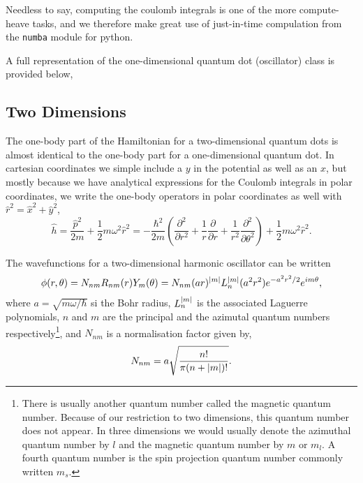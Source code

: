 Needless to say, computing the coulomb integrals is one of the more compute-heave tasks,
and we therefore make great use of just-in-time compulation from the \lstinline{numba} 
module for python.

A full representation of the one-dimensional quantum dot (oscillator) class is provided 
below,


\subsection{Two Dimensions}

The one-body part of the Hamiltonian for a two-dimensional quantum dots is almost
identical to the one-body part for a one-dimensional quantum dot. In cartesian
coordinates we simple include a $y$ in the potential as well as an $x$, but mostly 
because we have analytical expressions for the Coulomb integrals in polar
coordinates\cite{anisimovas1998energy}, we write the one-body operators in 
polar coordinates as well with $\hat{r}^2 = \hat{x}^2 + \hat{y}^2$,
\begin{equation}
    \label{eq:2d_ho_one_body_hamiltonian}
    \hat{h} = \frac{\hat{p}^2}{2m} + \frac{1}{2}m\omega^2\hat{r}^2
        = - \frac{\hbar^2}{2m}\left(
            \frac{\partial^2}{\partial r^2}
            + \frac{1}{r} \frac{\partial}{\partial r}
            + \frac{1}{r^2} \frac{\partial^2}{\partial \theta^2}
        \right)
        + \frac{1}{2}m\omega^2\hat{r}^2.
\end{equation}

The wavefunctions for a two-dimensional harmonic oscillator can be
written
\begin{equation}
    \label{eq:2d_ho_eigenstate}
    \phi(r,\theta) = N_{nm} R_{nm}(r) Y_m(\theta) = N_{nm} (ar)^{\abs{m}} L_n^{\abs{m}}(a^2r^2)
        e^{-a^2r^2/2} e^{im\theta},
\end{equation}
where $a=\sqrt{m\omega/\hbar}$ si the Bohr radius, $L^{\abs{m}}_n$ is 
the associated Laguerre polynomials, $n$ and $m$ are the principal and
the azimutal quantum numbers respectively\footnote{There is usually another quantum 
number called the magnetic quantum number. Because of our restriction to two dimensions,
this quantum number does not appear. In three dimensions we would usually denote the azimuthal
quantum number by $l$ and the magnetic quantum number by $m$ or $m_l$. A fourth quantum 
number is the spin projection quantum number commonly written $m_s$.}, and $N_{nm}$ is a normalisation 
factor given by,
\begin{equation}
    N_{nm} = a\sqrt{\frac{n!}{\pi(n + \abs{m})!}}.
\end{equation}


